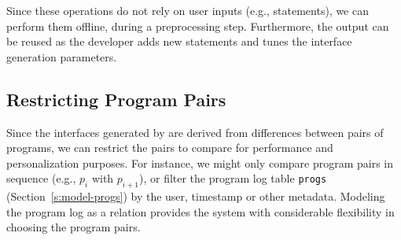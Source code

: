 Since these operations do not rely on user inputs (e.g., \lang statements), we can perform them offline, during a preprocessing step. Furthermore, the output can be reused as the developer adds new \lang statements and tunes the interface generation parameters.


\subsection{Restricting Program Pairs}

Since the interfaces generated by \sys are derived from differences between pairs of programs, we can restrict the pairs to compare for performance and personalization purposes.   For instance, we might only compare program pairs in sequence (e.g., $p_i$ with $p_{i+1}$), or filter the program log table \texttt{progs} (Section~\ref{s:model-progs}) by the user, timestamp or other metadata.  Modeling the program log as a relation provides the system with considerable flexibility in choosing the program pairs.
